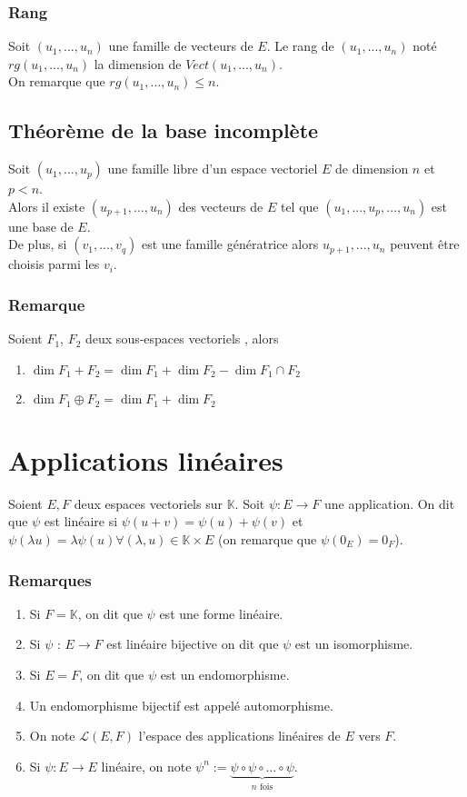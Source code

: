 \documentclass[a4paper,10pt]{book} %
\newcommand{\K}{\mathbb{K}}
\newcommand{\evs}{espaces vectoriels }
\newcommand{\ev}{espace vectoriel }
\newcommand{\sevs}{sous-espaces vectoriels }
\begin{document}
\subsubsection{Rang}
Soit $(u_1,...,u_n)$ une famille de vecteurs de $E$. Le rang de $(u_1,...,u_n)$ noté $rg(u_1,...,u_n)$ la dimension de $Vect(u_1,...,u_n)$.\\

On remarque que $rg(u_1,...,u_n)\leq n$.

\newpage

\subsection{Théorème de la base incomplète}
Soit $(u_1,...,u_p)$ une famille libre d'un \ev $E$ de dimension $n$ et $p<n$.\\

Alors il existe $(u_{p+1},...,u_n)$ des vecteurs de $E$ tel que $(u_1,...,u_p,...,u_n)$ est une base de $E$.\\

De plus, si $(v_1,...,v_q)$ est une famille génératrice alors $u_{p+1},...,u_n$ peuvent être choisis parmi les $v_i$.

\subsubsection{Remarque}
Soient $F_1$, $F_2$ deux \sevs, alors 
\begin{enumerate}
\item $\dim F_1+F_2=\dim F_1+\dim F_2-\dim F_1\cap F_2$
\item $\dim F_1\oplus F_2=\dim F_1 +\dim F_2$
\end{enumerate}

\section{Applications linéaires}
Soient $E,F$ deux \evs sur $\K$. Soit $\psi : E \rightarrow F$ une application. On dit que $\psi$ est linéaire si $\psi(u+v)=\psi(u)+\psi(v)$ et $\psi(\lambda u)=\lambda \psi(u) \forall (\lambda,u)\in \K\times E$ (on remarque que $\psi(0_E)=0_F$).

\subsubsection{Remarques}
\begin{enumerate}
\item Si $F=\K$, on dit que $\psi$ est une forme linéaire.
\item Si $\psi$ : $E\rightarrow F$ est linéaire bijective on dit que $\psi$ est un isomorphisme.
\item Si $E=F$, on dit que $\psi$ est un endomorphisme.
\item Un endomorphisme bijectif est appelé automorphisme.
\item On note $\mathcal{L}(E,F)$ l'espace des applications linéaires de $E$ vers $F$.
\item Si $\psi : E \rightarrow E$ linéaire, on note $\psi^n:=\underset{n\text{ fois}}{\underbrace{\psi\circ \psi \circ...\circ \psi}}$.
\end{enumerate}
\end{document}
